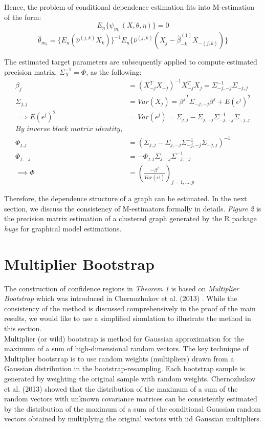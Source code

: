 \documentclass{article}
\begin{document}
\noindent Hence, the problem of conditional dependence estimation fits into M-estimation of the form:
\[
    E_n\{\psi_{m_r}(X,\theta,\eta)\} = 0 
\]
\[
    \hat{\theta}_{m_r} = \{ E_{n} (\hat{\nu}^{(j,k)}X_k)\}^{-1} E_{n} \{\hat{\nu}^{(j,k)}(X_{j}-\hat{\beta}_{-k}^{(1)}X_{-(j,k)})\}
\]

\noindent The estimated target parameters are subsequently applied to compute estimated precision matrix, $\Sigma^{-1}_X = \Phi$, as the following:\\
\begin{align*}
    \beta_j &= (X_{-j}^T X_{-j})^{-1} X_{-j}^T X_j = \Sigma^{-1}_{-j,-j} \Sigma_{-j,j} \\
    \Sigma_{j,j} &= Var(X_j) = {\beta^j}^T \Sigma_{-j,-j} \beta^j + E(\epsilon^j)^2 \\
    \implies E(\epsilon^j)^2 &= Var(\epsilon^j) = \Sigma_{j,j} - \Sigma_{j,-j} \Sigma^{-1}_{-j,-j} \Sigma_{-j,j} \\
    \textit{By inverse block matrix identity,}\\
    \Phi_{j,j} &= (\Sigma_{j,j} - \Sigma_{j,-j} \Sigma^{-1}_{-j,-j} \Sigma_{-j,j})^{-1} \\
    \Phi_{j,-j} &= -\Phi_{j,j} \Sigma_{j,-j} \Sigma^{-1}_{-j,-j} \\
    \implies \Phi &= (\frac{-\beta^j}{Var(\epsilon^j)})_{j=1,...,p}
\end{align*}

\noindent Therefore, the dependence structure of a graph can be estimated. In the next section, we discuss the consistency of M-estimators formally in details. \textit{Figure 2} is the precision matrix estimation of a clustered graph generated by the R package \textit{huge} for graphical model estimations. \\

\section{Multiplier Bootstrap}
The construction of confidence regions in \textit{Theorem 1} is based on \textit{Multiplier Bootstrap} which was introduced in Chernozhukov et al. (2013) \cite{Victor_2013}. While the consistency of the method is discussed comprehensively in the proof of the main results, we would like to use a simplified simulation to illustrate the method in this section.\\

\noindent Multiplier (or wild) bootstrap is method for Gaussian approximation for the maximum of a sum of
high-dimensional random vectors. The key technique of Multiplier bootstrap is to use random weights (multipliers) drawn from a Gaussian distribution in the bootstrap-resampling. Each bootstrap sample is generated by weighting the original sample with random weights. Chernozhukov et al. (2013) showed that the distribution of the maximum of a sum
of the random vectors with unknown covariance matrices can be consistently estimated by the distribution of the maximum of a sum of the conditional Gaussian random vectors obtained by multiplying the original vectors with iid Gaussian multipliers. \\
\end{document}
